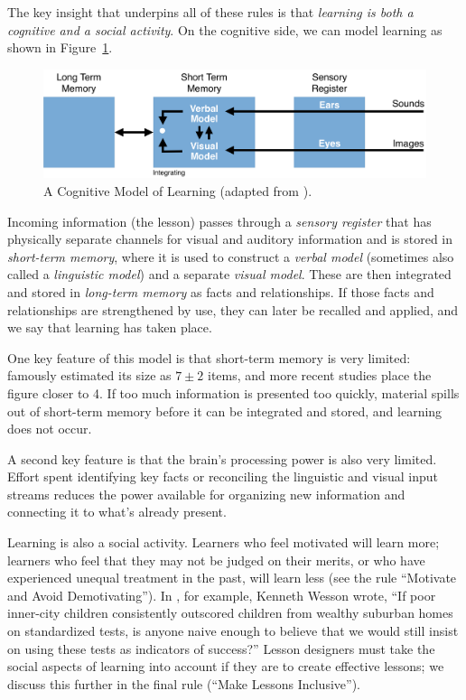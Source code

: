 \documentclass[10pt,letterpaper]{article}
\begin{document}
The key insight that underpins all of these rules is that \emph{learning is both
  a cognitive and a social activity}.  On the cognitive side, we can model
learning as shown in Figure~\ref{cognitive-model}.

\begin{figure}[ht]
\includegraphics[width=12cm]{cognitive-model.pdf}
\caption{A Cognitive Model of Learning (adapted from \cite{Maye2009}).}
\label{cognitive-model}
\end{figure}

Incoming information (the lesson) passes through a \emph{sensory register} that
has physically separate channels for visual and auditory information and is
stored in \emph{short-term memory}, where it is used to construct a \emph{verbal
  model} (sometimes also called a \emph{linguistic model}) and a separate
\emph{visual model}.  These are then integrated and stored in \emph{long-term
  memory} as facts and relationships.  If those facts and relationships are
strengthened by use, they can later be recalled and applied, and we say that
learning has taken place.

One key feature of this model is that short-term memory is very limited:
\cite{Mill1956} famously estimated its size as $7{\pm}2$ items, and more
recent studies place the figure closer to 4.  If too much information is
presented too quickly, material spills out of short-term memory before it can be
integrated and stored, and learning does not occur.

A second key feature is that the brain's processing power is also very limited.
Effort spent identifying key facts or reconciling the linguistic and visual
input streams reduces the power available for organizing new information and
connecting it to what's already present.

Learning is also a social activity. Learners who feel motivated will learn more;
learners who feel that they may not be judged on their merits, or who have
experienced unequal treatment in the past, will learn less (see the rule
``Motivate and Avoid Demotivating''). In \cite{Litt2004}, for example, Kenneth
Wesson wrote, ``If poor inner-city children consistently outscored children from
wealthy suburban homes on standardized tests, is anyone naive enough to believe
that we would still insist on using these tests as indicators of success?''
Lesson designers must take the social aspects of learning into account if they
are to create effective lessons; we discuss this further in the final rule
(``Make Lessons Inclusive'').
\end{document}
